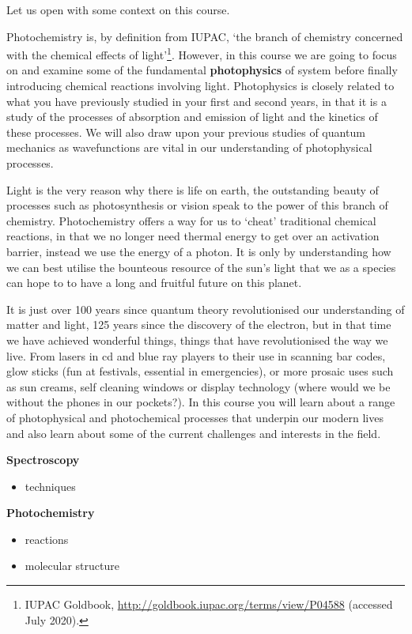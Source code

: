 \documentclass[
]{book}
\providecommand{\tightlist}{%
  \setlength{\itemsep}{0pt}\setlength{\parskip}{0pt}}
\begin{document}
Let us open with some context on this course.

Photochemistry is, by definition from IUPAC, `the branch of chemistry concerned with the chemical effects of light'\footnote{IUPAC Goldbook, \url{http://goldbook.iupac.org/terms/view/P04588} (accessed July 2020).}. However, in this course we are going to focus on and examine some of the fundamental \textbf{photophysics} of system before finally introducing chemical reactions involving light. Photophysics is closely related to what you have previously studied in your first and second years, in that it is a study of the processes of absorption and emission of light and the kinetics of these processes. We will also draw upon your previous studies of quantum mechanics as wavefunctions are vital in our understanding of photophysical processes.

Light is the very reason why there is life on earth, the outstanding beauty of processes such as photosynthesis or vision speak to the power of this branch of chemistry. Photochemistry offers a way for us to `cheat' traditional chemical reactions, in that we no longer need thermal energy to get over an activation barrier, instead we use the energy of a photon. It is only by understanding how we can best utilise the bounteous resource of the sun's light that we as a species can hope to to have a long and fruitful future on this planet.

It is just over 100 years since quantum theory revolutionised our understanding of matter and light, 125 years since the discovery of the electron, but in that time we have achieved wonderful things, things that have revolutionised the way we live. From lasers in cd and blue ray players to their use in scanning bar codes, glow sticks (fun at festivals, essential in emergencies), or more prosaic uses such as sun creams, self cleaning windows or display technology (where would we be without the phones in our pockets?). In this course you will learn about a range of photophysical and photochemical processes that underpin our modern lives and also learn about some of the current challenges and interests in the field.

\textbf{Spectroscopy}

\begin{itemize}
\tightlist
\item
  techniques
\end{itemize}

\textbf{Photochemistry}

\begin{itemize}
\tightlist
\item
  reactions
\item
  molecular structure
\end{itemize}
\end{document}

